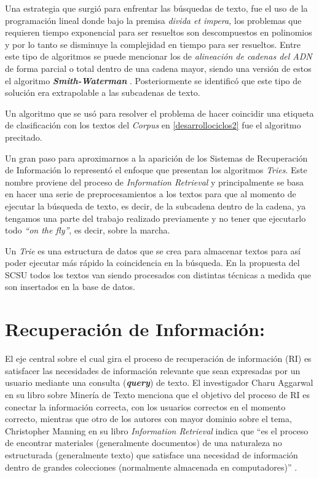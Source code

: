 \documentclass[
  10,
  openany]{book}
\begin{document}
Una estrategia que surgió para enfrentar las búsquedas de texto, fue el uso de la programación lineal donde bajo la premisa \emph{divida et impera,} los problemas que requieren tiempo exponencial para ser resueltos son descompuestos en polinomios y por lo tanto se disminuye la complejidad en tiempo para ser resueltos. Entre este tipo de algoritmos se puede mencionar los de \emph{alineación de cadenas del ADN} de forma parcial o total dentro de una cadena mayor, siendo una versión de estos el algoritmo \textbf{\emph{Smith-Waterman}} \citep{smith1981}. Posteriormente se identificó que este tipo de solución era extrapolable a las subcadenas de texto.

Un algoritmo que se usó para resolver el problema de hacer coincidir una etiqueta de clasificación con los textos del \emph{Corpus} en \ref{desarrollociclos2} fue el algoritmo precitado.

Un gran paso para aproximarnos a la aparición de los Sistemas de Recuperación de Información lo representó el enfoque que presentan los algoritmos \emph{Tries}. Este nombre proviene del proceso de \emph{Information Retrieval} y principalmente se basa en hacer una serie de preprocesamientos a los textos para que al momento de ejecutar la búsqueda de texto, es decir, de la subcadena dentro de la cadena, ya tengamos una parte del trabajo realizado previamente y no tener que ejecutarlo todo \emph{``on the fly''}, es decir, sobre la marcha.

Un \emph{Trie} \citep{fredkin1960} es una estructura de datos que se crea para almacenar textos para así poder ejecutar más rápido la coincidencia en la búsqueda. En la propuesta del SCSU todos los textos van siendo procesados con distintas técnicas a medida que son insertados en la base de datos.

\hypertarget{infret}{%
\section{Recuperación de Información:}\label{infret}}

El eje central sobre el cual gira el proceso de recuperación de información (RI) es satisfacer las necesidades de información relevante que sean expresadas por un usuario mediante una consulta (\textbf{\emph{query}}) de texto. El investigador Charu Aggarwal en su libro sobre Minería de Texto \citep{miningt2012} menciona que el objetivo del proceso de RI es conectar la información correcta, con los usuarios correctos en el momento correcto, mientras que otro de los autores con mayor dominio sobre el tema, Christopher Manning en su libro \emph{Information Retrieval} indica que ``es el proceso de encontrar materiales (generalmente documentos) de una naturaleza no estructurada (generalmente texto) que satisface una necesidad de información dentro de grandes colecciones (normalmente almacenada en computadores)'' \citep{manning2008}.
\end{document}
